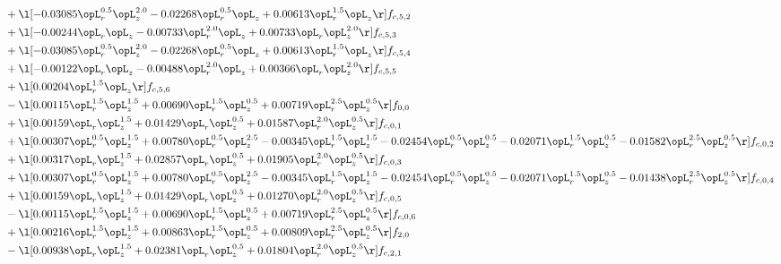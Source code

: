 \begin{alignat}{2}
& + \l[  -0.03085 \opL_r^{0.5} \opL_z^{2.0}   -0.02268 \opL_r^{0.5} \opL_z +  0.00613 \opL_r^{1.5} \opL_z  \r] f_{c,5,2} \nonumber \\ 
& + \l[  -0.00244 \opL_r \opL_z   -0.00733 \opL_r^{2.0} \opL_z +  0.00733 \opL_r \opL_z^{2.0}  \r] f_{c,5,3} \nonumber \\ 
& + \l[  -0.03085 \opL_r^{0.5} \opL_z^{2.0}   -0.02268 \opL_r^{0.5} \opL_z +  0.00613 \opL_r^{1.5} \opL_z  \r] f_{c,5,4} \nonumber \\ 
& + \l[  -0.00122 \opL_r \opL_z   -0.00488 \opL_r^{2.0} \opL_z +  0.00366 \opL_r \opL_z^{2.0}  \r] f_{c,5,5} \nonumber \\ 
& + \l[  0.00204 \opL_r^{1.5} \opL_z  \r] f_{c,5,6} \nonumber \\ 
& - \l[  0.00115 \opL_r^{1.5} \opL_z^{1.5} +  0.00690 \opL_r^{1.5} \opL_z^{0.5} +  0.00719 \opL_r^{2.5} \opL_z^{0.5}  \r] f_{0,0} \nonumber \\ 
& + \l[  0.00159 \opL_r \opL_z^{1.5} +  0.01429 \opL_r \opL_z^{0.5} +  0.01587 \opL_r^{2.0} \opL_z^{0.5}  \r] f_{c,0,1} \nonumber \\ 
& + \l[  0.00307 \opL_r^{0.5} \opL_z^{1.5} +  0.00780 \opL_r^{0.5} \opL_z^{2.5}   -0.00345 \opL_r^{1.5} \opL_z^{1.5}   -0.02454 \opL_r^{0.5} \opL_z^{0.5}   -0.02071 \opL_r^{1.5} \opL_z^{0.5}   -0.01582 \opL_r^{2.5} \opL_z^{0.5}  \r] f_{c,0,2} \nonumber \\ 
& + \l[  0.00317 \opL_r \opL_z^{1.5} +  0.02857 \opL_r \opL_z^{0.5} +  0.01905 \opL_r^{2.0} \opL_z^{0.5}  \r] f_{c,0,3} \nonumber \\ 
& + \l[  0.00307 \opL_r^{0.5} \opL_z^{1.5} +  0.00780 \opL_r^{0.5} \opL_z^{2.5}   -0.00345 \opL_r^{1.5} \opL_z^{1.5}   -0.02454 \opL_r^{0.5} \opL_z^{0.5}   -0.02071 \opL_r^{1.5} \opL_z^{0.5}   -0.01438 \opL_r^{2.5} \opL_z^{0.5}  \r] f_{c,0,4} \nonumber \\ 
& + \l[  0.00159 \opL_r \opL_z^{1.5} +  0.01429 \opL_r \opL_z^{0.5} +  0.01270 \opL_r^{2.0} \opL_z^{0.5}  \r] f_{c,0,5} \nonumber \\ 
& - \l[  0.00115 \opL_r^{1.5} \opL_z^{1.5} +  0.00690 \opL_r^{1.5} \opL_z^{0.5} +  0.00719 \opL_r^{2.5} \opL_z^{0.5}  \r] f_{c,0,6} \nonumber \\ 
& + \l[  0.00216 \opL_r^{1.5} \opL_z^{1.5} +  0.00863 \opL_r^{1.5} \opL_z^{0.5} +  0.00809 \opL_r^{2.5} \opL_z^{0.5}  \r] f_{2,0} \nonumber \\ 
& - \l[  0.00938 \opL_r \opL_z^{1.5} +  0.02381 \opL_r \opL_z^{0.5} +  0.01804 \opL_r^{2.0} \opL_z^{0.5}  \r] f_{c,2,1} \nonumber \\ 

\end{alignat}

